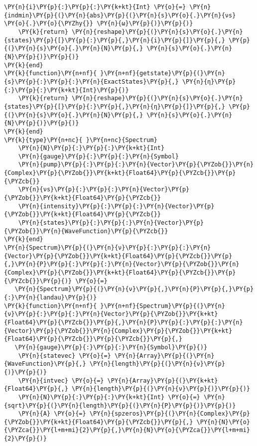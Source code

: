 \begin{Verbatim}[commandchars=\\\{\}]
    \PY{n}{i}\PY{p}{:}\PY{p}{:}\PY{k+kt}{Int} \PY{o}{=} \PY{n}{indmin}\PY{p}{(}\PY{n}{abs}\PY{p}{(}\PY{n}{s}\PY{o}{.}\PY{n}{νs} \PY{o}{.}\PY{o}{\PYZhy{}} \PY{n}{ω}\PY{p}{)}\PY{p}{)}
    \PY{k}{return} \PY{n}{reshape}\PY{p}{(}\PY{n}{s}\PY{o}{.}\PY{n}{states}\PY{p}{[}\PY{p}{:}\PY{p}{,}\PY{n}{i}\PY{p}{]}\PY{p}{,} \PY{p}{(}\PY{n}{s}\PY{o}{.}\PY{n}{N}\PY{p}{,} \PY{n}{s}\PY{o}{.}\PY{n}{N}\PY{p}{)}\PY{p}{)}
\PY{k}{end}
\PY{k}{function}\PY{n+nf}{ }\PY{n+nf}{getstate}\PY{p}{(}\PY{n}{s}\PY{p}{:}\PY{p}{:}\PY{n}{ExactStates}\PY{p}{,} \PY{n}{η}\PY{p}{:}\PY{p}{:}\PY{k+kt}{Int}\PY{p}{)}
    \PY{k}{return} \PY{n}{reshape}\PY{p}{(}\PY{n}{s}\PY{o}{.}\PY{n}{states}\PY{p}{[}\PY{p}{:}\PY{p}{,}\PY{n}{η}\PY{p}{]}\PY{p}{,} \PY{p}{(}\PY{n}{s}\PY{o}{.}\PY{n}{N}\PY{p}{,} \PY{n}{s}\PY{o}{.}\PY{n}{N}\PY{p}{)}\PY{p}{)}
\PY{k}{end}
\PY{k}{type}\PY{n+nc}{ }\PY{n+nc}{Spectrum}
    \PY{n}{N}\PY{p}{:}\PY{p}{:}\PY{k+kt}{Int}
    \PY{n}{gauge}\PY{p}{:}\PY{p}{:}\PY{n}{Symbol}
    \PY{n}{pump}\PY{p}{:}\PY{p}{:}\PY{n}{Vector}\PY{p}{\PYZob{}}\PY{n}{Complex}\PY{p}{\PYZob{}}\PY{k+kt}{Float64}\PY{p}{\PYZcb{}}\PY{p}{\PYZcb{}}
    \PY{n}{νs}\PY{p}{:}\PY{p}{:}\PY{n}{Vector}\PY{p}{\PYZob{}}\PY{k+kt}{Float64}\PY{p}{\PYZcb{}}
    \PY{n}{intensity}\PY{p}{:}\PY{p}{:}\PY{n}{Vector}\PY{p}{\PYZob{}}\PY{k+kt}{Float64}\PY{p}{\PYZcb{}}
    \PY{n}{states}\PY{p}{:}\PY{p}{:}\PY{n}{Vector}\PY{p}{\PYZob{}}\PY{n}{WaveFunction}\PY{p}{\PYZcb{}}
\PY{k}{end}
\PY{n}{Spectrum}\PY{p}{(}\PY{n}{ν}\PY{p}{:}\PY{p}{:}\PY{n}{Vector}\PY{p}{\PYZob{}}\PY{k+kt}{Float64}\PY{p}{\PYZcb{}}\PY{p}{,}\PY{n}{P}\PY{p}{:}\PY{p}{:}\PY{n}{Vector}\PY{p}{\PYZob{}}\PY{n}{Complex}\PY{p}{\PYZob{}}\PY{k+kt}{Float64}\PY{p}{\PYZcb{}}\PY{p}{\PYZcb{}}\PY{p}{)} \PY{o}{=}
   \PY{n}{Spectrum}\PY{p}{(}\PY{n}{ν}\PY{p}{,}\PY{n}{P}\PY{p}{,}\PY{p}{:}\PY{n}{landau}\PY{p}{)}
\PY{k}{function}\PY{n+nf}{ }\PY{n+nf}{Spectrum}\PY{p}{(}\PY{n}{ν}\PY{p}{:}\PY{p}{:}\PY{n}{Vector}\PY{p}{\PYZob{}}\PY{k+kt}{Float64}\PY{p}{\PYZcb{}}\PY{p}{,}\PY{n}{P}\PY{p}{:}\PY{p}{:}\PY{n}{Vector}\PY{p}{\PYZob{}}\PY{n}{Complex}\PY{p}{\PYZob{}}\PY{k+kt}{Float64}\PY{p}{\PYZcb{}}\PY{p}{\PYZcb{}}\PY{p}{,}
   \PY{n}{gauge}\PY{p}{:}\PY{p}{:}\PY{n}{Symbol}\PY{p}{)}
    \PY{n}{statevec} \PY{o}{=} \PY{n}{Array}\PY{p}{(}\PY{n}{WaveFunction}\PY{p}{,} \PY{n}{length}\PY{p}{(}\PY{n}{ν}\PY{p}{)}\PY{p}{)}
    \PY{n}{intvec} \PY{o}{=} \PY{n}{Array}\PY{p}{(}\PY{k+kt}{Float64}\PY{p}{,} \PY{n}{length}\PY{p}{(}\PY{n}{ν}\PY{p}{)}\PY{p}{)}
    \PY{n}{N}\PY{p}{:}\PY{p}{:}\PY{k+kt}{Int} \PY{o}{=} \PY{n}{sqrt}\PY{p}{(}\PY{n}{length}\PY{p}{(}\PY{n}{P}\PY{p}{)}\PY{p}{)}
    \PY{n}{A} \PY{o}{=} \PY{n}{spzeros}\PY{p}{(}\PY{n}{Complex}\PY{p}{\PYZob{}}\PY{k+kt}{Float64}\PY{p}{\PYZcb{}}\PY{p}{,} \PY{n}{N}\PY{o}{\PYZca{}}\PY{l+m+mi}{2}\PY{p}{,}\PY{n}{N}\PY{o}{\PYZca{}}\PY{l+m+mi}{2}\PY{p}{)}

\end{Verbatim}
